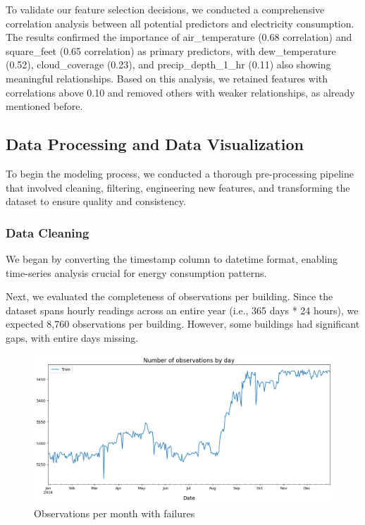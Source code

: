 To validate our feature selection decisions, we conducted a comprehensive correlation analysis between all potential predictors and electricity consumption. The results confirmed the importance of air\_temperature (0.68 correlation) and square\_feet (0.65 correlation) as primary predictors, with dew\_temperature (0.52), cloud\_coverage (0.23), and precip\_depth\_1\_hr (0.11) also showing meaningful relationships. Based on this analysis, we retained features with correlations above 0.10 and removed others with weaker relationships, as already mentioned before.


\subsection{Data Processing and Data Visualization}

To begin the modeling process, we conducted a thorough pre-processing pipeline that involved cleaning, filtering, engineering new features, and transforming the dataset to ensure quality and consistency.

\subsubsection{Data Cleaning}


We began by converting the timestamp column to datetime format, enabling time-series analysis crucial for energy consumption patterns.

Next, we evaluated the completeness of observations per building. Since the dataset spans hourly readings across an entire year (i.e., 365 days * 24 hours), we expected 8,760 observations per building. However, some buildings had significant gaps, with entire days missing.

\begin{figure}[!h]
    \centering
    \includegraphics[width=0.75\linewidth]{images/obser_by_day.png}
    \caption{Observations per month with failures}
    \label{fig:obs-by-month-bad}
\end{figure}

